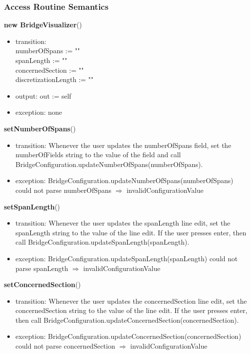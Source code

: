 \documentclass[12pt, titlepage]{article}
\begin{document}
\subsubsection{Access Routine Semantics}

\noindent \textbf{new BridgeVisualizer}()
\begin{itemize}
\item transition: \\
        numberOfSpans := ""\\
		spanLength := ""\\
		concernedSection := ""\\
		discretizationLength := ""
\item output: out := self
\item exception: none
\end{itemize}

\noindent \textbf{setNumberOfSpans}()
\begin{itemize}
\item transition: Whenever the user updates the numberOfSpans field, set the numberOfFields string to the value of the field and call BridgeConfiguration.updateNumberOfSpans(numberOfSpans).
\item exception: BridgeConfiguration.updateNumberOfSpans(numberOfSpans) could not parse numberOfSpans $\Rightarrow$ invalidConfigurationValue
\end{itemize}

\noindent \textbf{setSpanLength}()
\begin{itemize}
\item transition: Whenever the user updates the spanLength line edit, set the spanLength string to the value of the line edit. If the user presses enter, then call BridgeConfiguration.updateSpanLength(spanLength).
\item exception: BridgeConfiguration.updateSpanLength(spanLength) could not parse spanLength $\Rightarrow$ invalidConfigurationValue
\end{itemize}

\noindent \textbf{setConcernedSection}()
\begin{itemize}
\item transition: Whenever the user updates the concernedSection line edit, set the concernedSection string to the value of the line edit. If the user presses enter, then call BridgeConfiguration.updateConcernedSection(concernedSection).
\item exception: BridgeConfiguration.updateConcernedSection(concernedSection) could not parse concernedSection $\Rightarrow$ invalidConfigurationValue
\end{itemize}
\end{document}
